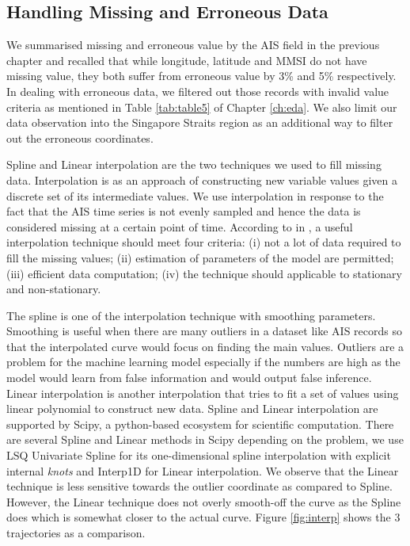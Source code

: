 \subsection{Handling Missing and Erroneous Data}
We summarised missing and erroneous value by the AIS field in the previous chapter and recalled that while longitude, latitude and MMSI do not have missing value, they both suffer from erroneous value by 3\% and 5\% respectively. In dealing with erroneous data, we filtered out those records with invalid value criteria as mentioned in Table \ref{tab:table5} of Chapter \ref{ch:eda}. We also limit our data observation into the Singapore Straits region as an additional way to filter out the erroneous coordinates.

Spline and Linear interpolation are the two techniques we used to fill missing data. Interpolation is as an approach of constructing new variable values given a discrete set of its intermediate values. We use interpolation in response to the fact that the AIS time series is not evenly sampled and hence the data is considered missing at a certain point of time. According to \cite{beveridge1992least} in \cite{lepot2017interpolation}, a useful interpolation technique should meet four criteria: (i) not a lot of data required to fill the missing values; (ii) estimation of parameters of the model are permitted; (iii) efficient data computation; (iv) the technique should applicable to stationary and non-stationary. 

The spline is one of the interpolation technique with smoothing parameters. Smoothing is useful when there are many outliers in a dataset like AIS records so that the interpolated curve would focus on finding the main values. Outliers are a problem for the machine learning model especially if the numbers are high as the model would learn from false information and would output false inference. Linear interpolation is another interpolation that tries to fit a set of values using linear polynomial to construct new data. Spline and Linear interpolation are supported by Scipy, a python-based ecosystem for scientific computation. There are several Spline and Linear methods in Scipy depending on the problem, we use LSQ Univariate Spline for its one-dimensional spline interpolation with explicit internal \emph{knots} and Interp1D for Linear interpolation. We observe that the Linear technique is less sensitive towards the outlier coordinate as compared to Spline. However, the Linear technique does not overly smooth-off the curve as the Spline does which is somewhat closer to the actual curve. Figure \ref{fig:interp} shows the 3 trajectories as a comparison.

